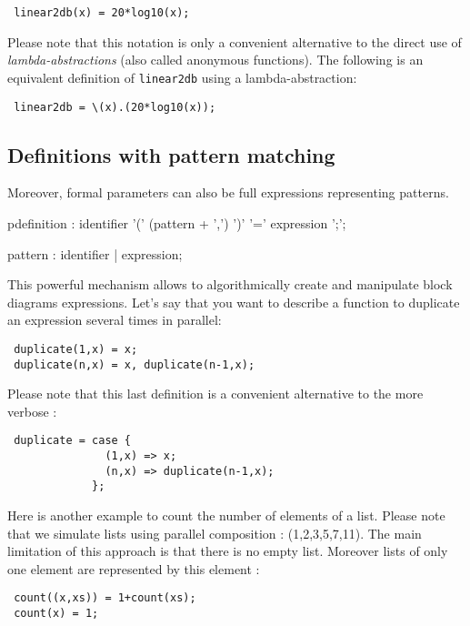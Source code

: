 \begin{lstlisting}
 linear2db(x) = 20*log10(x);
\end{lstlisting}
 
Please note that this notation is only a convenient alternative to the direct use of \textit{lambda-abstractions} (also called anonymous functions). The following is an equivalent definition of \lstinline'linear2db' using a lambda-abstraction:

\begin{lstlisting}
 linear2db = \(x).(20*log10(x));
\end{lstlisting}

\subsection{Definitions with pattern matching}

Moreover, formal parameters can also be full expressions representing patterns. 
\begin{rail}
pdefinition  : identifier '(' (pattern + ',')  ')' '=' expression ';';
\end{rail}

\begin{rail}
pattern : identifier | expression; 
\end{rail}

This powerful mechanism allows to algorithmically create and manipulate block diagrams expressions. Let's say that you want to describe a function to duplicate an expression several times in parallel:
\begin{lstlisting}
 duplicate(1,x) = x;
 duplicate(n,x) = x, duplicate(n-1,x);
\end{lstlisting}

Please note that this last definition is a convenient alternative to the more verbose :
\begin{lstlisting}
 duplicate = case { 
               (1,x) => x; 
               (n,x) => duplicate(n-1,x); 
             };
\end{lstlisting}

Here is another example to count the number of elements of a list. Please note that we simulate lists using parallel composition : (1,2,3,5,7,11). The main limitation of this approach is that there is no empty list. Moreover lists of only one element are represented by this element :
\begin{lstlisting}
 count((x,xs)) = 1+count(xs);
 count(x) = 1;
\end{lstlisting}


